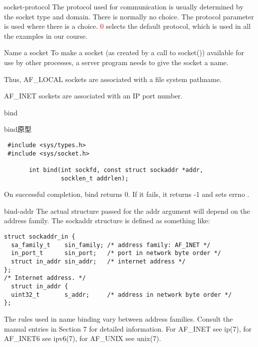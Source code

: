\documentclass{beamer}
\begin{document}
\begin{frame}{socket-protocol}
The protocol used for communication is usually determined by the socket type and domain. There is normally no choice. The protocol parameter is used where there is a choice. \textcolor{red}{0 }selects the default protocol, which is used in all the examples in our course.
\end{frame}
\begin{frame}{Name a socket}
To make a socket (as created by a call to socket()) available for use by other processes, a server program needs to give the socket a name. 

Thus, AF\_LOCAL sockets are associated with a file system pathname. 

AF\_INET sockets are associated with an IP port number.
\end{frame}
\begin{frame}[fragile]{bind}
\begin{block}{bind原型}
\begin{verbatim}
 #include <sys/types.h>          
 #include <sys/socket.h>

       int bind(int sockfd, const struct sockaddr *addr,
                socklen_t addrlen);
\end{verbatim}
\end{block}

On successful completion, bind returns 0. If it fails, it returns -1 and sets errno .
\end{frame}
\begin{frame}[fragile]{bind-addr}       
       The actual structure passed for the addr argument will depend on the address family.  The sockaddr structure is defined as something like:
\begin{verbatim}
struct sockaddr_in {
  sa_family_t    sin_family; /* address family: AF_INET */
  in_port_t      sin_port;   /* port in network byte order */
  struct in_addr sin_addr;   /* internet address */
};
/* Internet address. */
  struct in_addr {
  uint32_t       s_addr;     /* address in network byte order */
};
\end{verbatim}
The rules used in name binding vary between address families.  Consult the manual entries in Section 7 for detailed information.  For AF\_INET see ip(7), for AF\_INET6 see  ipv6(7),  for  AF\_UNIX  see
       unix(7).
\end{frame}
\end{document}
